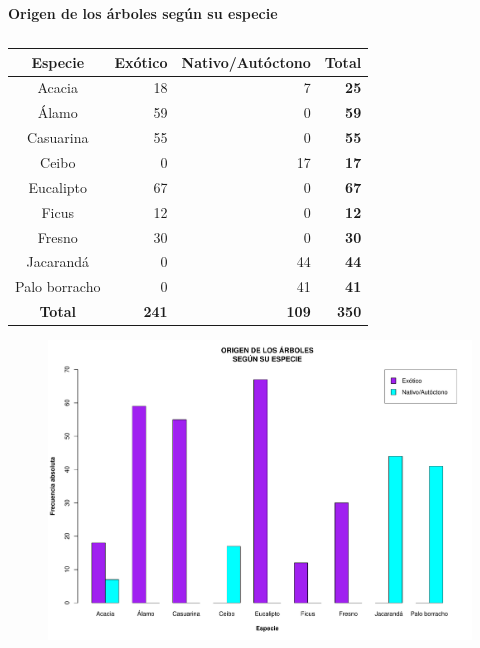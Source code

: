 \documentclass[11pt]{article}
\begin{document}
\begin{table}[h!]
  \begin{center}
    \caption*{\textbf{Origen de los árboles según su especie}}
    \begin{tabular}{| c | r | r | r |}
      \hline
      \textbf{Especie} & \textbf{Exótico} & \textbf{Nativo/Autóctono} &
      \textbf{Total}                                                                 \\ \hline
      Acacia           & 18               & 7                         & \textbf{25}  \\ \hline
      Álamo            & 59               & 0                         & \textbf{59}  \\ \hline
      Casuarina        & 55               & 0                         & \textbf{55}  \\ \hline
      Ceibo            & 0                & 17                        & \textbf{17}  \\ \hline
      Eucalipto        & 67               & 0                         & \textbf{67}  \\ \hline
      Ficus            & 12               & 0                         & \textbf{12}  \\ \hline
      Fresno           & 30               & 0                         & \textbf{30}  \\ \hline
      Jacarandá        & 0                & 44                        & \textbf{44}  \\ \hline
      Palo borracho    & 0                & 41                        & \textbf{41}  \\ \hline
      \textbf{Total}   & \textbf{241}     & \textbf{109}              & \textbf{350} \\ \hline
    \end{tabular}
    \caption{}
    \label{tab:tablaOrigenEspecie}
  \end{center}
\end{table}

\begin{figure}[h!]
  \begin{center}
    \includegraphics[width=0.9\linewidth]{barrasOrigenEspecie.pdf}
    \caption{}
    \label{fig:barrasOrigenEspecie}
  \end{center}
\end{figure}
\end{document}
